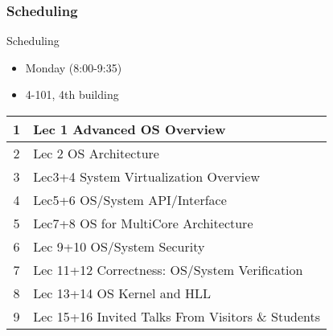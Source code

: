 %
%
\begin{frame}[t]
	\frametitle{Scheduling}

\large
Scheduling
\begin{itemize}
	
	\item Monday (8:00-9:35)　
	\item 4-101, 4th building

\end{itemize}
\begin{table}[]
	\begin{tabular}{|c|l|}
		\hline
		1 & Lec 1 Advanced OS Overview                        \\ \hline
		2 & Lec 2 OS Architecture                             \\ \hline
		3 & Lec3+4  System Virtualization Overview            \\ \hline
		4 & Lec5+6  OS/System API/Interface                   \\ \hline
		5 & Lec7+8 OS for MultiCore Architecture              \\ \hline
		6 & Lec 9+10 OS/System Security                       \\ \hline
		7 & Lec 11+12 Correctness: OS/System Verification     \\ \hline
		8 & Lec 13+14 OS Kernel and HLL                       \\ \hline
		9 & Lec 15+16 Invited Talks From Visitors \& Students \\ \hline
	\end{tabular}
\end{table}

\end{frame}


